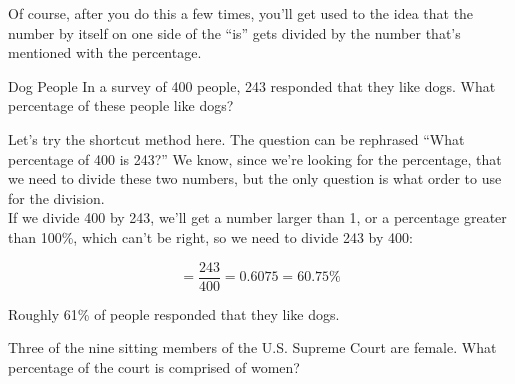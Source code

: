 Of course, after you do this a few times, you'll get used to the idea that the number by itself on one side of the ``is'' gets divided by the number that's mentioned with the percentage.

\begin{example}[https://www.youtube.com/watch?v=C8SnqyhsVeo&list=PLfmpjsIzhztsZtnb7HnXrQ8SLoiOCIcAM&index=5]{Dog People}
In a survey of 400 people, 243 responded that they like dogs.  What percentage of these people like dogs?

\solline

Let's try the shortcut method here.  The question can be rephrased ``What percentage of 400 is 243?''  We know, since we're looking for the percentage, that we need to divide these two numbers, but the only question is what order to use for the division.\\

If we divide 400 by 243, we'll get a number larger than 1, or a percentage greater than 100\%, which can't be right, so we need to divide 243 by 400:

\[=\dfrac{243}{400} = 0.6075 = \boxed{60.75\%}\]

Roughly 61\% of people responded that they like dogs.
\end{example}

\begin{try}
Three of the nine sitting members of the U.S. Supreme Court are female.  What percentage of the court is comprised of women?
\end{try}
\pagebreak

\text{}
\vfill

